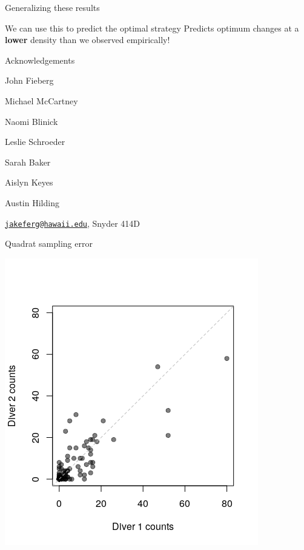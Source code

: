 \documentclass[ignorenonframetext,]{beamer}
\begin{document}
\begin{frame}{Generalizing these results}
\begin{block}{We can use this to predict the optimal strategy}
Predicts optimum changes at a \textbf{lower} density than we observed
empirically!

\end{block}

\begin{block}{Acknowledgements}

John Fieberg

Michael McCartney

Naomi Blinick

Leslie Schroeder

Sarah Baker

Aislyn Keyes

Austin Hilding

\href{mailto:jakeferg@hawaii.edu}{\nolinkurl{jakeferg@hawaii.edu}},
Snyder 414D

\end{block}

\begin{block}{Quadrat sampling error}

\begin{center}\includegraphics[width=0.5\linewidth]{../Figures/DiverCountComparison} \end{center}

\end{block}

\end{frame}
\end{document}
